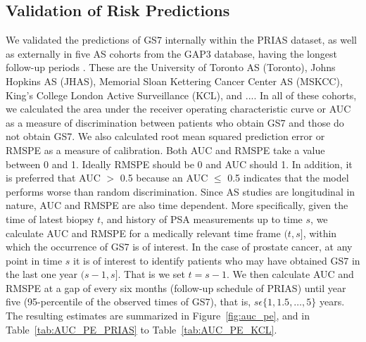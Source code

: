 \subsection{Validation of Risk Predictions}
We validated the predictions of GS7 internally within the PRIAS dataset, as well as externally in five AS cohorts from the GAP3 database, having the longest follow-up periods \citep{gap3_2018}. These are the University of Toronto AS (Toronto), Johns Hopkins AS (JHAS), Memorial Sloan Kettering Cancer Center AS (MSKCC), King's College London Active Surveillance (KCL), and ....  In all of these cohorts, we calculated the area under the receiver operating characteristic curve or AUC \cite{rizopoulos2017dynamic} as a measure of discrimination between patients who obtain GS7 and those do not obtain GS7. We also calculated root mean squared prediction error or RMSPE \cite{rizopoulos2017dynamic} as a measure of calibration. Both AUC and RMSPE take a value between 0 and 1. Ideally RMSPE should be 0 and AUC should 1. In addition, it is preferred that AUC $>$ 0.5 because an AUC $\leq$ 0.5 indicates that the model performs worse than random discrimination. Since AS studies are longitudinal in nature, AUC and RMSPE are also time dependent. More specifically, given the time of latest biopsy $t$, and history of PSA measurements up to time $s$, we calculate AUC and RMSPE for a medically relevant time frame $(t, s]$, within which the occurrence of GS7 is of interest. In the case of prostate cancer, at any point in time $s$ it is of interest to identify patients who may have obtained GS7 in the last one year $(s-1, s]$. That is we set $t=s-1$. We then calculate AUC and RMSPE at a gap of every six months (follow-up schedule of PRIAS) until year five (95-percentile of the observed times of GS7), that is, $s \epsilon \{1, 1.5, \ldots, 5\}$ years. The resulting estimates are summarized in Figure~\ref{fig:auc_pe}, and in Table~\ref{tab:AUC_PE_PRIAS} to Table~\ref{tab:AUC_PE_KCL}.

